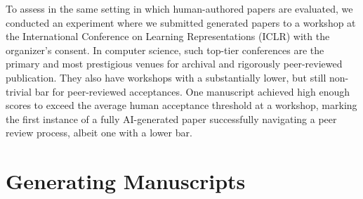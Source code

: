 To assess \ouralgo in the same setting in which human-authored papers are evaluated, we conducted an experiment where we submitted generated papers to a workshop at the International Conference on Learning Representations (ICLR) with the organizer's consent.
In computer science, such top-tier conferences are the primary and most prestigious venues for archival and rigorously peer-reviewed publication.
They also have workshops with a substantially lower, but still non-trivial bar for peer-reviewed acceptances.
One manuscript achieved high enough scores to exceed the average human acceptance threshold at a workshop, marking the first instance of a fully AI-generated paper successfully navigating a peer review process, albeit one with a lower bar.

\section{Generating Manuscripts}

